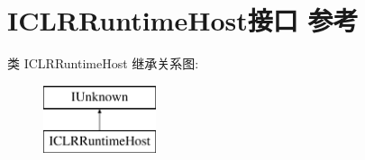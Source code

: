 \hypertarget{interface_i_c_l_r_runtime_host}{}\section{I\+C\+L\+R\+Runtime\+Host接口 参考}
\label{interface_i_c_l_r_runtime_host}
类 I\+C\+L\+R\+Runtime\+Host 继承关系图\+:\begin{figure}[H]
\begin{center}
\leavevmode
\includegraphics[height=2.000000cm]{interface_i_c_l_r_runtime_host}
\end{center}
\end{figure}
